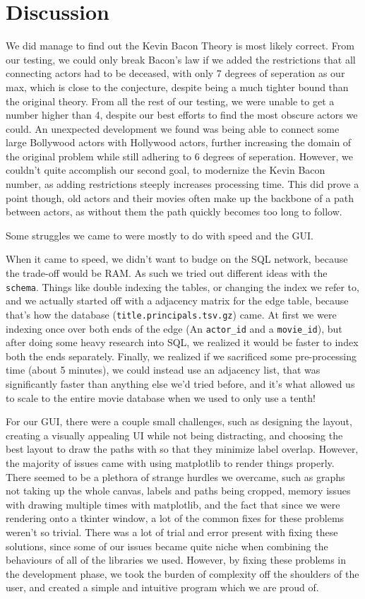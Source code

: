 \documentclass{article}
\begin{document}
\section{Discussion}
We did manage to find out the Kevin Bacon Theory is most likely correct. From our testing, we could only break Bacon's law if we added the restrictions that all connecting actors had to be deceased, with only 7 degrees of seperation as our max, which is close to the conjecture, despite being a much tighter bound than the original theory. From all the rest of our testing, we were unable to get a number higher than 4, despite our best efforts to find the most obscure actors we could. An unexpected development we found was being able to connect some large Bollywood actors with Hollywood actors, further increasing the domain of the original problem while still adhering to 6 degrees of seperation. However, we couldn't quite accomplish our second goal, to modernize the Kevin Bacon number, as adding restrictions steeply increases processing time. This did prove a point though, old actors and their movies often make up the backbone of a path between actors, as without them the path quickly becomes too long to follow.

Some struggles we came to were mostly to do with speed and the GUI.

When it came to speed, we didn't want to budge on the SQL network, because the trade-off would be RAM. As such we tried out different ideas with the \verb!schema!. Things like double indexing the tables, or changing the index we refer to, and we actually started off with a adjacency matrix for the edge table, because that's how the database (\verb!title.principals.tsv.gz!) came. At first we were indexing once over both ends of the edge (An \verb!actor_id! and a \verb!movie_id!), but after doing some heavy research into SQL, we realized it would be faster to index both the ends separately. Finally, we realized if we sacrificed some pre-processing time (about 5 minutes), we could instead use an adjacency list, that was significantly faster than anything else we'd tried before, and it's what allowed us to scale to the entire movie database when we used to only use a tenth!

For our GUI, there were a couple small challenges, such as designing the layout, creating a visually appealing UI while not being distracting, and choosing the best layout to draw the paths with so that they minimize label overlap. However, the majority of issues came with using matplotlib to render things properly. There seemed to be a plethora of strange hurdles we overcame, such as graphs not taking up the whole canvas, labels and paths being cropped, memory issues with drawing multiple times with matplotlib, and the fact that since we were rendering onto a tkinter window, a lot of the common fixes for these problems weren't so trivial. There was a lot of trial and error present with fixing these solutions, since some of our issues became quite niche when combining the behaviours of all of the libraries we used. However, by fixing these problems in the development phase, we took the burden of complexity off the shoulders of the user, and created a simple and intuitive program which we are proud of.
\end{document}
